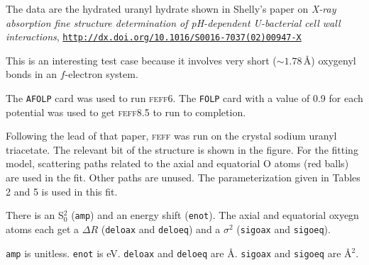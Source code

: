 \documentclass{article}
\begin{document}
The data are the hydrated uranyl hydrate shown in Shelly's paper on
\textit{X-ray absorption fine structure determination of pH-dependent
  U-bacterial cell wall interactions},
\href{http://dx.doi.org/10.1016/S0016-7037(02)00947-X}
{\texttt{http://dx.doi.org/10.1016/S0016-7037(02)00947-X}}

This is an interesting test case because it involves very short
($\sim1.78$\,\AA) oxygenyl bonds in an $f$-electron system.

The \texttt{AFOLP} card was used to run \textsc{feff}6.  The
\texttt{FOLP} card with a value of 0.9 for each potential was used to
get \textsc{feff}8.5 to run to completion.

Following the lead of that paper, \textsc{feff} was run on the crystal
sodium uranyl triacetate.  The relevant bit of the structure is shown
in the figure.  For the fitting model, scattering paths related to the
axial and equatorial O atoms (red balls) are used in the fit.  Other
paths are unused.  The parameterization given in Tables 2 and 5 is
used in this fit.

There is an S$_0^2$ (\texttt{amp}) and an energy shift
(\texttt{enot}).  The axial and equatorial oxyegn atoms each get a
$\Delta R$ (\texttt{deloax} and \texttt{deloeq}) and a $\sigma^2$
(\texttt{sigoax} and \texttt{sigoeq}).

\texttt{amp} is unitless.  \texttt{enot} is eV.
\texttt{deloax} and \texttt{deloeq} are \AA.
\texttt{sigoax} and \texttt{sigoeq} are \AA$^2$.

\renewcommand{\feffmaterial}{uranyl}
\renewcommand{\feffrone}{2.5}
\renewcommand{\feffrtwo}{2.9}
\renewcommand{\feffrthree}{4.0}
\renewcommand{\feffrfour}{5.2}
\renewcommand{\feffrfive}{6.8}
\renewcommand{\fefffirst}{}

\small

\fitplots
\end{document}
